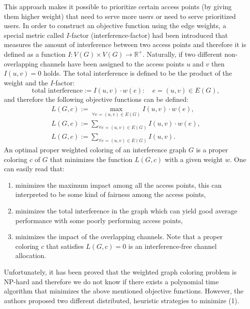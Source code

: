 \documentclass[a4paper, 12pt]{article}
\begin{document}
This approach makes it possible to prioritize certain access points (by giving them higher weight) that need to serve more users or need to serve prioritized users. In order to construct an objective function using the edge weights, a special metric called $I$-factor (interference-factor) had been introduced that measures the amount of interference between two access points and therefore it is defined as a function $I\colon V(G) \times V(G) \to \mathbb{R}^+$. Naturally, if two different non-overlapping channels have been assigned to the access points $u$ and $v$ then $I(u,v)=0$ holds. The total interference is defined to be the product of the weight and the $I$-factor:
$$
\text{total interference}:=I(u,v) \cdot w(e): \quad e=(u,v) \in E(G),
$$
and therefore the following objective functions can be defined:
\begin{gather}
L(G,c) := \max_{\forall e = (u,v) \in E(G)}I(u,v) \cdot w(e), \\
L(G,c) := \sum_{\forall e = (u,v) \in E(G)}I(u,v) \cdot w(e), \\
L(G,c) := \sum_{\forall e = (u,v) \in E(G)}I(u,v).
\end{gather}
An optimal proper weighted coloring of an interference graph $G$ is a proper coloring $c$ of $G$ that minimizes the function $L(G,c)$ with a given weight $w$. One can easily read that:
\begin{enumerate}[(1)]
\item minimizes the maximum impact among all the access points, this can interpreted to be some kind of fairness among the access points,
\item minimizes the total interference in the graph which can yield good average performance with some poorly performing access points,
\item minimizes the impact of the overlapping channels. Note that a proper coloring $c$ that satisfies $L(G,c)=0$ is an interference-free channel allocation.
\end{enumerate}
Unfortunately, it has been proved that the weighted graph coloring problem is NP-hard and therefore we do not know if there exists a polynomial time algorithm that minimizes the above mentioned objective functions. However, the authors proposed two different distributed, heuristic strategies to minimize (1).
\end{document}

